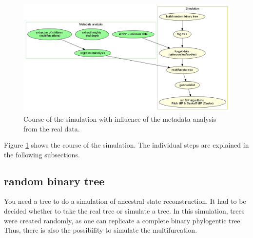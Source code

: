     \begin{figure}[h!]
      \centering
      \includegraphics[width=1\textwidth]{Figures/Workflow-Simulation.png}
      \caption{Course of the simulation with influence of the metadata analysis from the real data.}
      \label{fig:Simulation Workflow}
    \end{figure}


    Figure \ref{fig:Simulation Workflow} shows the course of the simulation. The individual steps are 
      explained in the following subsections.


    \subsection{random binary tree}
      You need a tree to do a simulation of ancestral state reconstruction. It had to be decided whether 
        to take the real tree or simulate a tree. In this simulation, trees were created randomly, as 
        one can replicate a complete binary phylogentic tree. Thus, there is also the possibility to 
        simulate the multifurcation. \\
      
